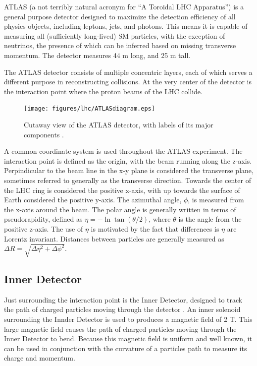 ATLAS (a not terribly natural acronym for ``A Toroidal LHC Apparatus'') is a general purpose detector designed to maximize the detection efficiency of all physics objects, including leptons, jets, and photons. This means it is capable of measuring all (sufficiently long-lived) SM particles, with the exception of neutrinos, the presence of which can be inferred based on missing transverse momentum. The detector measures 44 m long, and 25 m tall. 

The ATLAS detector consists of multiple concentric layers, each of which serves a different purpose in reconstructing collisions. At the very center of the detector is the interaction point where the proton beams of the LHC collide. 

\begin{figure}[H]
\centering
   \texttt{[image: figures/lhc/ATLASdiagram.eps]}
\caption{Cutaway view of the ATLAS detector, with labels of its major components \cite{ATLAS_figure}.}
\label{fig:ATLAS}
\end{figure}

A common coordinate system is used throughout the ATLAS experiment. The interaction point is defined as the origin, with the beam running along the z-axis. Perpindicular to the beam line in the x-y plane is considered the transverse plane, sometimes referred to generally as the transverse direction. Towards the center of the LHC ring is considered the positive x-axis, with up towards the surface of Earth considered the positive y-axis. The azimuthal angle, $\phi$, is measured from the x-axis around the beam. The polar angle is generally written in terms of pseudorapidity, defined as $\eta = -\ln\tan(\theta/2)$, where $\theta$ is the angle from the positive z-axis. The use of $\eta$ is motivated by the fact that differences is $\eta$ are Lorentz invariant. Distances between particles are generally measured as $\Delta R = \sqrt{\Delta\eta^2 + \Delta\phi^2}$.

\subsection{Inner Detector}
\label{sec:innerDetector}

Just surrounding the interaction point is the Inner Detector, designed to track the path of charged particles moving through the detector \cite{IDET-2010-01}. An inner solenoid surrounding the Innder Detector is used to produces a magnetic field of 2 T. This large magnetic field causes the path of charged particles moving through the Inner Detector to bend. Because this magnetic field is uniform and well known, it can be used in conjunction with the curvature of a particles path to measure its charge and momentum.

